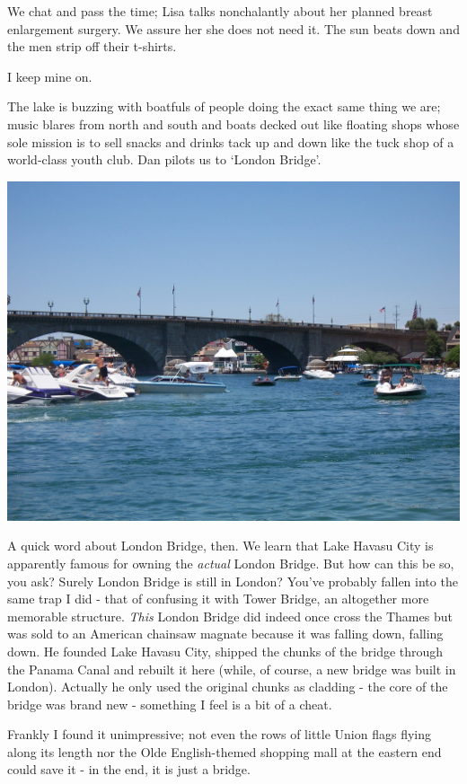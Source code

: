 \documentclass[a5paper,titlepage,11pt]{book}
\begin{document}
We chat and pass the time; Lisa talks nonchalantly about her planned breast enlargement surgery.  We assure her she does not need it.  The sun beats down and the men strip off their t-shirts.

I keep mine on.

The lake is buzzing with boatfuls of people doing the exact same thing we are; music blares from north and south and boats decked out like floating shops whose sole mission is to sell snacks and drinks tack up and down like the tuck shop of a world-class youth club.  Dan pilots us to `London Bridge'.

\begin{center}\includegraphics[width=\textwidth]{gfx/100_1598}\end{center}

A quick word about London Bridge, then.  We learn that Lake Havasu City is apparently famous for owning the \emph{actual} London Bridge.  But how can this be so, you ask?  Surely London Bridge is still in London?  You've probably fallen into the same trap I did - that of confusing it with Tower Bridge, an altogether more memorable structure.  \emph{This} London Bridge did indeed once cross the Thames but was sold to an American chainsaw magnate because it was falling down, falling down.  He founded Lake Havasu City, shipped the chunks of the bridge through the Panama Canal and rebuilt it here (while, of course, a new bridge was built in London).  Actually he only used the original chunks as cladding - the core of the bridge was brand new - something I feel is a bit of a cheat.

Frankly I found it unimpressive; not even the rows of little Union flags flying along its length nor the Olde English-themed shopping mall at the eastern end could save it - in the end, it is just a bridge.
\end{document}

